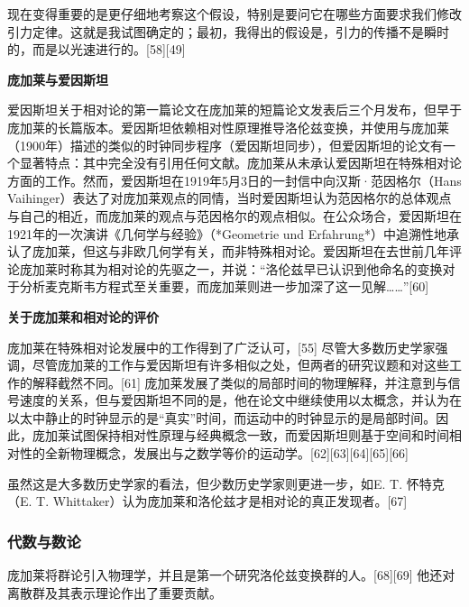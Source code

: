 现在变得重要的是更仔细地考察这个假设，特别是要问它在哪些方面要求我们修改引力定律。这就是我试图确定的；最初，我得出的假设是，引力的传播不是瞬时的，而是以光速进行的。[58][49]

\textbf{庞加莱与爱因斯坦}

爱因斯坦关于相对论的第一篇论文在庞加莱的短篇论文发表后三个月发布，但早于庞加莱的长篇版本。爱因斯坦依赖相对性原理推导洛伦兹变换，并使用与庞加莱（1900年）描述的类似的时钟同步程序（爱因斯坦同步），但爱因斯坦的论文有一个显著特点：其中完全没有引用任何文献。庞加莱从未承认爱因斯坦在特殊相对论方面的工作。然而，爱因斯坦在1919年5月3日的一封信中向汉斯·范因格尔（Hans Vaihinger）表达了对庞加莱观点的同情，当时爱因斯坦认为范因格尔的总体观点与自己的相近，而庞加莱的观点与范因格尔的观点相似。在公众场合，爱因斯坦在1921年的一次演讲《几何学与经验》（*Geometrie und Erfahrung*）中追溯性地承认了庞加莱，但这与非欧几何学有关，而非特殊相对论。爱因斯坦在去世前几年评论庞加莱时称其为相对论的先驱之一，并说：“洛伦兹早已认识到他命名的变换对于分析麦克斯韦方程式至关重要，而庞加莱则进一步加深了这一见解……”[60]

\textbf{关于庞加莱和相对论的评价} 

庞加莱在特殊相对论发展中的工作得到了广泛认可，[55] 尽管大多数历史学家强调，尽管庞加莱的工作与爱因斯坦有许多相似之处，但两者的研究议题和对这些工作的解释截然不同。[61] 庞加莱发展了类似的局部时间的物理解释，并注意到与信号速度的关系，但与爱因斯坦不同的是，他在论文中继续使用以太概念，并认为在以太中静止的时钟显示的是“真实”时间，而运动中的时钟显示的是局部时间。因此，庞加莱试图保持相对性原理与经典概念一致，而爱因斯坦则基于空间和时间相对性的全新物理概念，发展出与之数学等价的运动学。[62][63][64][65][66]

虽然这是大多数历史学家的看法，但少数历史学家则更进一步，如E. T. 怀特克（E. T. Whittaker）认为庞加莱和洛伦兹才是相对论的真正发现者。[67]
\subsubsection{代数与数论}
庞加莱将群论引入物理学，并且是第一个研究洛伦兹变换群的人。[68][69] 他还对离散群及其表示理论作出了重要贡献。
